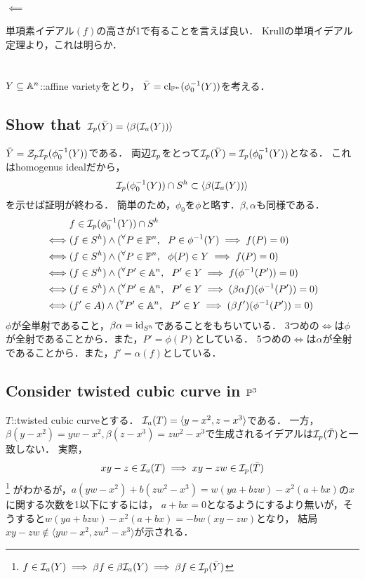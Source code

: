 \documentclass[a4paper]{jsarticle}
\begin{document}
    \paragraph{$\impliedby$}
    単項素イデアル$(f)$の高さが1で有ることを言えば良い．
    Krullの単項イデアル定理より，これは明らか．

\section{ } %
    $Y \subseteq \affine^n$::affine varietyをとり，
    $\bar{Y}=\cl_{\proj^{n}}(\phi_0^{-1}(Y))$を考える．

    \subsection{Show that $\defsp(\bar{Y})=\langle \beta(\defsa(Y)) \rangle$}
    $\bar{Y}=\zerosp \defsp(\phi_0^{-1}(Y))$である．
    両辺$\defsp$をとって$\defsp(\bar{Y})=\defsp(\phi_0^{-1}(Y))$となる．
    これはhomogenus idealだから，
    \[ \defsp(\phi_0^{-1}(Y)) \cap S^h \subset \langle \beta(\defsa(Y)) \rangle \]を示せば証明が終わる．
    簡単のため，$\phi_0$を$\phi$と略す．$\beta, \alpha$も同様である．
    \begin{align*}
            &   f \in \defsp(\phi_0^{-1}(Y)) \cap S^h \\
        \iff&   (f \in S^h) \land (\Forall{P \in \proj^n} P \in \phi^{-1}(Y) \implies f(P)=0) \\
        \iff&   (f \in S^h) \land (\Forall{P \in \proj^n} \phi(P) \in Y \implies f(P)=0) \\
        \iff&   (f \in S^h) \land (\Forall{P' \in \affine^n} P' \in Y \implies f(\phi^{-1}(P'))=0) \\
        \iff&   (f \in S^h) \land (\Forall{P' \in \affine^n} P' \in Y \implies (\beta \alpha f)(\phi^{-1}(P'))=0) \\
        \iff&   (f' \in A) \land (\Forall{P' \in \affine^n} P' \in Y \implies (\beta f')(\phi^{-1}(P'))=0)
    \end{align*}
    $\phi$が全単射であること，$\beta \alpha=\id[S^h]$であることをもちいている．
    3つめの$\iff$は$\phi$が全射であることから．また，$P'=\phi(P)$としている．
    5つめの$\iff$は$\alpha$が全射であることから．また，$f'=\alpha(f)$としている．

    \subsection{Consider twisted cubic curve in $\proj^3$}
    $T$::twisted cubic curveとする．
    $\defsa(T)=\langle y-x^2, z-x^3 \rangle$である．
    一方，$\beta(y-x^2)=yw-x^2, \beta(z-x^3)=zw^2-x^3$で生成されるイデアルは$\defsp(\bar{T})$と一致しない．
    実際，\[ xy-z \in \defsa(T) \implies xy-zw \in \defsp(\bar{T})\]
    \footnote{$f \in \defsa(Y) \implies \beta f \in \beta \defsa(Y) \implies \beta f \in \defsp(\bar{Y})$}
    がわかるが，$a(yw-x^2)+b(zw^2-x^3)=w(ya+bzw)-x^2(a+bx)$の$x$に関する次数を1以下にするには，
    $a+bx=0$となるようにするより無いが，そうすると$w(ya+bzw)-x^2(a+bx)=-bw(xy-zw)$となり，
    結局$xy-zw \not \in \langle yw-x^2, zw^2-x^3 \rangle$が示される．
\end{document}
